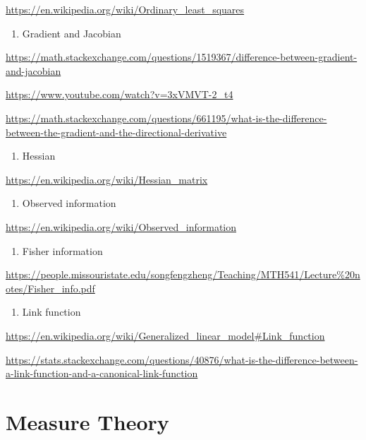 \documentclass[
]{book}
\providecommand{\tightlist}{%
  \setlength{\itemsep}{0pt}\setlength{\parskip}{0pt}}
\begin{document}
\url{https://en.wikipedia.org/wiki/Ordinary_least_squares}

\begin{enumerate}
\def\labelenumi{\arabic{enumi}.}
\setcounter{enumi}{3}
\tightlist
\item
  Gradient and Jacobian
\end{enumerate}

\url{https://math.stackexchange.com/questions/1519367/difference-between-gradient-and-jacobian}

\url{https://www.youtube.com/watch?v=3xVMVT-2_t4}

\url{https://math.stackexchange.com/questions/661195/what-is-the-difference-between-the-gradient-and-the-directional-derivative}

\begin{enumerate}
\def\labelenumi{\arabic{enumi}.}
\setcounter{enumi}{4}
\tightlist
\item
  Hessian
\end{enumerate}

\url{https://en.wikipedia.org/wiki/Hessian_matrix}

\begin{enumerate}
\def\labelenumi{\arabic{enumi}.}
\setcounter{enumi}{5}
\tightlist
\item
  Observed information
\end{enumerate}

\url{https://en.wikipedia.org/wiki/Observed_information}

\begin{enumerate}
\def\labelenumi{\arabic{enumi}.}
\setcounter{enumi}{6}
\tightlist
\item
  Fisher information
\end{enumerate}

\url{https://people.missouristate.edu/songfengzheng/Teaching/MTH541/Lecture\%20notes/Fisher_info.pdf}

\begin{enumerate}
\def\labelenumi{\arabic{enumi}.}
\setcounter{enumi}{7}
\tightlist
\item
  Link function
\end{enumerate}

\url{https://en.wikipedia.org/wiki/Generalized_linear_model\#Link_function}

\url{https://stats.stackexchange.com/questions/40876/what-is-the-difference-between-a-link-function-and-a-canonical-link-function}

\hypertarget{measure-theory}{%
\chapter{Measure Theory}\label{measure-theory}}
\end{document}

